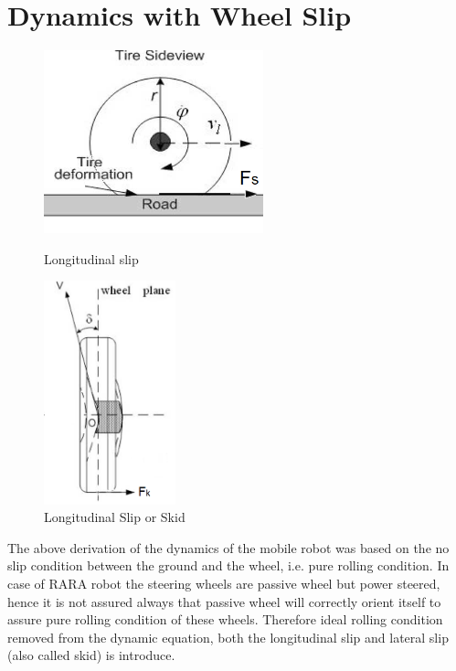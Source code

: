 {\section{Dynamics with Wheel Slip}
\begin{figure}
	\caption{}
	\begin{minipage}[t]{0.5\textwidth}
		\centering
		\includegraphics[width=2.5in]{Chapter3/fig/Slip} 
		\caption{Longitudinal slip}\label{fig:slip}
	\end{minipage}
	\hfill
	\begin{minipage}[t]{0.5\textwidth}
		\centering
		\includegraphics[width=1.5in]{Chapter3/fig/Skid} 
		\caption{Longitudinal Slip or Skid}\label{fig:skid}
	\end{minipage}
\end{figure}
The above derivation of the dynamics of the mobile robot was based on the no slip condition between the ground and the wheel, i.e. pure rolling condition. In case of RARA robot the steering wheels  are passive wheel but power steered, hence it is not assured always that passive wheel will correctly orient itself to assure pure rolling condition of these wheels. Therefore ideal rolling condition removed from the dynamic equation, both the longitudinal slip and lateral slip (also called skid) is introduce.
}

